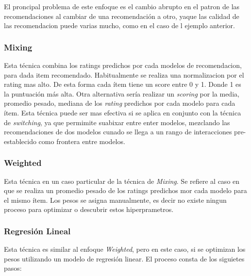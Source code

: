 \documentclass[11pt,a4paper,twoside]{thesis}
\begin{document}
El proncipal problema de este enfoque es el cambio abrupto en el patron de las
recomendaciones al cambiar de una recomendación a otro, yaque las calidad de
las recomendacion puede varias mucho, como en el caso de l ejemplo anterior.

\subsubsection{Mixing}

Esta técnica combina los ratings predichos por cada modelos de recomendacion,
para dada item recomendado. Habitualmente se realiza una normalizacion por el
rating mas alto. De esta forma cada ítem tiene un score entre 0 y 1. Donde 1 es
la puntuación más alta. Otra alternativa sería realizar un \textit{scoring} por
la media, promedio pesado, mediana de los \textit{rating} predichos por cada
modelo para cada ítem. Esta técnica puede ser mas efectiva si se aplica en
conjunto con la técnica de \textit{switching}, ya que permimite suabixar entre
enter modelos, mezclando las recomendaciones de dos modelos cunado se llega a
un rango de interacciones pre-establecido como frontera entre modelos.

\subsubsection{Weighted}

Esta técnica en un caso particular de la técnica de \textit{Mixing}. Se refiere
al caso en que se realiza un promedio pesado de los ratings predichos mor cada
modelo para el mismo ítem. Los pesos se asigna manualmente, es decir no existe
ningun proceso para optimizar o descubrir estos hiperprametros.

\subsubsection{Regresión Lineal}

Esta técnica es similar al enfoque \textit{Weighted}, pero en este caso, si se
optimizan los pesos utilizando un modelo de regresión linear. El proceso consta
de los siguietes pasos:
\end{document}
